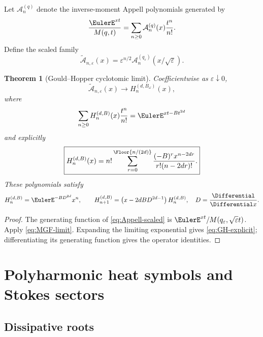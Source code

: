 \documentclass[11pt]{article}
\newtheorem{theorem}{Theorem}[section]
\theoremstyle{definition}
\newcommand{\eps}{\varepsilon}
\begin{document}
Let $\mathcal A_n^{(q)}$ denote the inverse-moment Appell polynomials generated by
\begin{equation}
 \frac{\EulerE^{xt}}{M(q,t)}
 =\sum_{n\ge0}\mathcal A_n^{(q)}(x)\frac{t^n}{n!}.
 \label{eq:Appell-q}
\end{equation}
Define the scaled family
\begin{equation}
 \widetilde{\mathcal A}_{n,\eps}(x)
 =\eps^{n/2}\mathcal A_n^{(q_\eps)}(x/\sqrt\eps).
 \label{eq:Appell-scaled}
\end{equation}

\begin{theorem}[Gould--Hopper cyclotomic limit]
Coefficientwise as $\eps\downarrow0$,
\begin{equation}
 \widetilde{\mathcal A}_{n,\eps}(x)
 \longrightarrow H_n^{(d,B_\omega)}(x),
 \label{eq:Appell-limit}
\end{equation}
where
\begin{equation}
 \sum_{n\ge0}H_n^{(d,B)}(x)\frac{t^n}{n!}
 =\EulerE^{xt-Bt^{2d}}
 \label{eq:GH-gen}
\end{equation}
and explicitly
\begin{equation}
 \boxed{
 H_n^{(d,B)}(x)
 =n!\sum_{r=0}^{\Floor{n/(2d)}}
 \frac{(-B)^r x^{n-2dr}}{r!(n-2dr)!}.}
 \label{eq:GH-explicit}
\end{equation}
These polynomials satisfy
\begin{equation}
 H_n^{(d,B)}=\EulerE^{-BD^{2d}}x^n,
 \qquad
 H_{n+1}^{(d,B)}=
 \left(x-2dB D^{2d-1}\right)H_n^{(d,B)},
 \quad D=\frac{\Differential}{\Differential x}.
 \label{eq:GH-operator}
\end{equation}
\end{theorem}

\begin{proof}
The generating function of \cref{eq:Appell-scaled} is
\(
 \EulerE^{xt}/M(q_\eps,\sqrt\eps t)
\).  Apply \cref{eq:MGF-limit}.  Expanding the limiting exponential gives \cref{eq:GH-explicit}; differentiating its generating function gives the operator identities.
\end{proof}

\section{Polyharmonic heat symbols and Stokes sectors}

\subsection{Dissipative roots}
\end{document}
